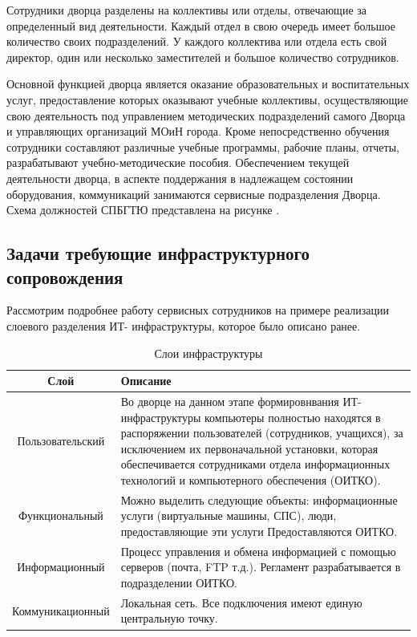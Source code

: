 \documentclass[utf8,usehyperref,12pt]{G7-32}
\begin{document}
Сотрудники дворца разделены на коллективы или отделы, отвечающие за определенный вид деятельности. 
Каждый отдел в свою очередь имеет большое количество своих подразделений. У каждого коллектива или отдела есть свой директор, один или несколько заместителей и большое количество сотрудников.

Основной функцией дворца является оказание образовательных и воспитательных услуг, предоставление которых оказывают учебные коллективы, осуществляющие свою деятельность под управлением методических подразделений самого Дворца
и управляющих организаций МОиН города. Кроме непосредственно обучения сотрудники  составляют различные учебные программы, рабочие планы, отчеты, разрабатывают учебно-методические пособия.
Обеспечением текущей деятельности дворца, в аспекте поддержания в надлежащем состоянии оборудования, коммуникаций занимаются сервисные подразделения Дворца. Схема должностей СПБГТЮ представлена на рисунке \pageref{fig:fig_management_struct}.

\subsection{Задачи требующие инфраструктурного сопровождения}
Рассмотрим подробнее работу сервисных сотрудников на примере реализации слоевого разделения ИТ- инфраструктуры, которое было описано ранее.

\begin{table}[ht]
  \centering %
  \caption{Слои инфраструктуры}\label{tab:tab1}
\begin{tabular}{|c|p{130mm}|}
\hline Слой & Описание \\ 
\hline Пользовательский & Во дворце на данном этапе формировнвания ИТ-инфраструктуры компьютеры полностью находятся в распоряжении пользователей  (сотрудников, учащихся), за исключением их первоначальной установки, которая обеспечивается сотрудниками отдела информационных технологий и компьютерного обеспечения (ОИТКО). \\ 
\hline Функциональный & Можно выделить следующие объекты:
информационные услуги (виртуальные машины, СПС), 
люди, предоставляющие эти услуги
Предоставляются ОИТКО. \\ 
\hline Информационный & Процесс управления и обмена информацией с помощью серверов (почта, FTP  т.д.). Регламент разрабатывается в подразделении ОИТКО. \\ 
\hline Коммуникационный & Локальная сеть. Все подключения имеют единую центральную точку. \\ 
\hline 
\end{tabular} 
\end{table}
\end{document}
